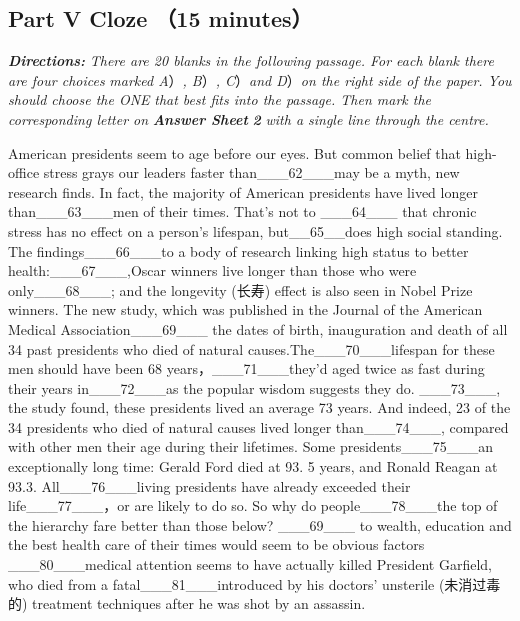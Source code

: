 \documentclass[UTF8,11pt]{ctexart}
\begin{document}
\subsection*{\textbf{Part V} \textbf{Cloze} （\textbf{15 minutes}）}


\textbf{\textit{Directions:}}\textit{ There are 20 blanks in the following passage. For each blank there are four choices} \textit{marked A}）\textit{, B}）\textit{, C}）\textit{and D}）\textit{on the right side of the paper. You should choose the ONE} \textit{that best fits into the passage. Then mark the corresponding letter on}\textbf{\textit{ Answer Sheet}} \textbf{\textit{2}}\textit{ with a single line through the centre.}


American presidents seem to age before our eyes. But common belief that high-office stress grays our leaders faster than\_\_\_62\_\_\_may be a myth, new research finds. In fact, the majority of American presidents have lived longer than\_\_\_63\_\_\_men of their times. That's not to \_\_\_64\_\_\_ that chronic stress has no effect on a person's lifespan, but\_\_65\_\_does high social standing. The findings\_\_\_66\_\_\_to a body of research linking high status to better health:\_\_\_67\_\_\_,Oscar winners live longer than those who were only\_\_\_68\_\_\_; and the longevity (长寿) effect is also seen in Nobel Prize winners. The new study, which was published in the Journal of the American Medical Association\_\_\_69\_\_\_ the dates of birth, inauguration and death of all 34 past presidents who died of natural causes.The\_\_\_70\_\_\_lifespan for these men should have been 68 years，\_\_\_71\_\_\_they'd aged twice as fast during their years in\_\_\_72\_\_\_as the popular wisdom suggests they do. \_\_\_73\_\_\_, the study found, these presidents lived an average 73 years. And indeed, 23 of the 34 presidents who died of natural causes lived longer than\_\_\_74\_\_\_, compared with other men their age during their lifetimes. Some presidents\_\_\_75\_\_\_an exceptionally long time: Gerald Ford died at 93. 5 years, and Ronald Reagan at 93.3. All\_\_\_76\_\_\_living presidents have already exceeded their life\_\_\_77\_\_\_，or are likely to do so. So why do people\_\_\_78\_\_\_the top of the hierarchy fare better than those below? \_\_\_69\_\_\_ to wealth, education and the best health care of their times would seem to be obvious factors \_\_\_80\_\_\_medical attention seems to have actually killed President Garfield, who died from a fatal\_\_\_81\_\_\_introduced by his doctors' unsterile (未消过毒的) treatment techniques after he was shot by an assassin.
\end{document}
